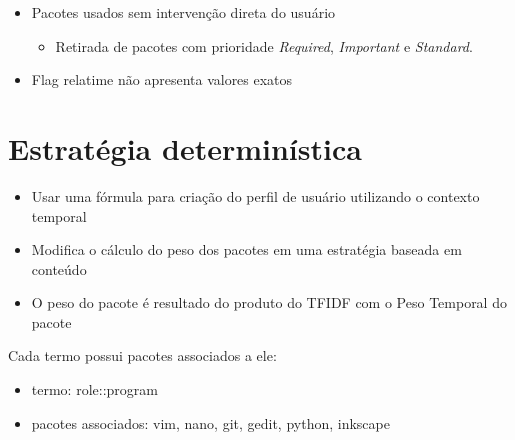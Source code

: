\begin{frame}

    \begin{itemize}
        \item Pacotes usados sem intervenção direta do usuário
            \begin{itemize}
                \item Retirada de pacotes com prioridade \textit{Required},
                      \textit{Important} e \textit{Standard}.
            \end{itemize}
        \item Flag relatime não apresenta valores exatos
    \end{itemize}

\end{frame}

\section{Estratégia determinística} %
\label{sec:estrategia_deterministica}

\begin{frame}
\begin{itemize}
    \item Usar uma fórmula para criação do perfil de usuário utilizando
    o contexto temporal
\end{itemize}
\end{frame}

\begin{frame}
\begin{itemize}
    \item Modifica o cálculo do peso dos pacotes em uma estratégia
    baseada em conteúdo
    \item O peso do pacote é resultado do produto do TFIDF com o
    Peso Temporal do pacote
\end{itemize}
\end{frame}

\begin{frame}
    Cada termo possui pacotes associados a ele:
    \begin{itemize}
        \item termo: role::program
        \item pacotes associados: vim, nano, git, gedit, python, inkscape
    \end{itemize}
\end{frame}

